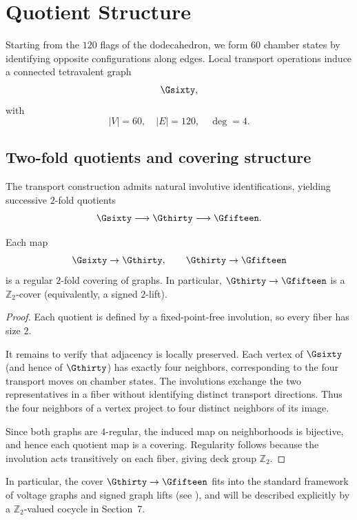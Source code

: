 \section{Quotient Structure}

Starting from the $120$ flags of the dodecahedron, we form $60$ chamber states
by identifying opposite configurations along edges. Local transport operations
induce a connected tetravalent graph
\[
\Gsixty,
\]
with
\[
|V| = 60, \quad |E| = 120, \quad \deg = 4.
\]

\subsection{Two-fold quotients and covering structure}

The transport construction admits natural involutive identifications,
yielding successive $2$-fold quotients
\[
\Gsixty \longrightarrow \Gthirty \longrightarrow \Gfifteen.
\]

\begin{proposition}
Each map
\[
\Gsixty \to \Gthirty, \qquad \Gthirty \to \Gfifteen
\]
is a regular $2$-fold covering of graphs. In particular,
$\Gthirty \to \Gfifteen$ is a $\mathbb{Z}_2$-cover (equivalently, a signed
$2$-lift).
\end{proposition}

\begin{proof}
Each quotient is defined by a fixed-point-free involution, so every fiber
has size $2$.

It remains to verify that adjacency is locally preserved. Each vertex of
$\Gsixty$ (and hence of $\Gthirty$) has exactly four neighbors, corresponding
to the four transport moves on chamber states. The involutions exchange
the two representatives in a fiber without identifying distinct transport
directions. Thus the four neighbors of a vertex project to four distinct
neighbors of its image.

Since both graphs are $4$-regular, the induced map on neighborhoods is
bijective, and hence each quotient map is a covering. Regularity follows
because the involution acts transitively on each fiber, giving deck group
$\mathbb{Z}_2$.
\end{proof}

In particular, the cover $\Gthirty \to \Gfifteen$ fits into the standard
framework of voltage graphs and signed graph lifts (see
\cite{gross_tucker,zaslavsky}), and will be described explicitly by a
$\mathbb{Z}_2$-valued cocycle in Section~7.


